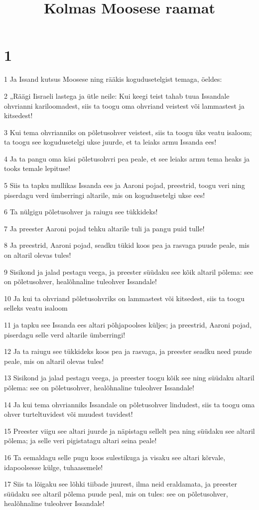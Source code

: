 

\title{Kolmas Moosese raamat}

\chapter{1}

\par 1 Ja Issand kutsus Moosese ning rääkis kogudusetelgist temaga, öeldes:
\par 2 „Räägi Iisraeli lastega ja ütle neile: Kui keegi teist tahab tuua Issandale ohvrianni kariloomadest, siis ta toogu oma ohvriand veistest või lammastest ja kitsedest!
\par 3 Kui tema ohvrianniks on põletusohver veistest, siis ta toogu üks veatu isaloom; ta toogu see kogudusetelgi ukse juurde, et ta leiaks armu Issanda ees!
\par 4 Ja ta pangu oma käsi põletusohvri pea peale, et see leiaks armu tema heaks ja tooks temale lepituse!
\par 5 Siis ta tapku mullikas Issanda ees ja Aaroni pojad, preestrid, toogu veri ning piserdagu verd ümberringi altarile, mis on kogudusetelgi ukse ees!
\par 6 Ta nülgigu põletusohver ja raiugu see tükkideks!
\par 7 Ja preester Aaroni pojad tehku altarile tuli ja pangu puid tulle!
\par 8 Ja preestrid, Aaroni pojad, seadku tükid koos pea ja rasvaga puude peale, mis on altaril olevas tules!
\par 9 Sisikond ja jalad pestagu veega, ja preester süüdaku see kõik altaril põlema: see on põletusohver, healõhnaline tuleohver Issandale!
\par 10 Ja kui ta ohvriand põletusohvriks on lammastest või kitsedest, siis ta toogu selleks veatu isaloom
\par 11 ja tapku see Issanda ees altari põhjapoolses küljes; ja preestrid, Aaroni pojad, piserdagu selle verd altarile ümberringi!
\par 12 Ja ta raiugu see tükkideks koos pea ja rasvaga, ja preester seadku need puude peale, mis on altaril olevas tules!
\par 13 Sisikond ja jalad pestagu veega, ja preester toogu kõik see ning süüdaku altaril põlema: see on põletusohver, healõhnaline tuleohver Issandale!
\par 14 Ja kui tema ohvrianniks Issandale on põletusohver lindudest, siis ta toogu oma ohver turteltuvidest või muudest tuvidest!
\par 15 Preester viigu see altari juurde ja näpistagu sellelt pea ning süüdaku see altaril põlema; ja selle veri pigistatagu altari seina peale!
\par 16 Ta eemaldagu selle pugu koos sulestikuga ja visaku see altari kõrvale, idapoolsesse külge, tuhaasemele!
\par 17 Siis ta lõigaku see lõhki tiibade juurest, ilma neid eraldamata, ja preester süüdaku see altaril põlema puude peal, mis on tules: see on põletusohver, healõhnaline tuleohver Issandale!

